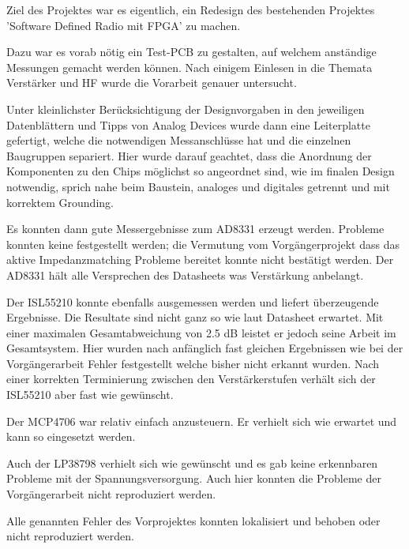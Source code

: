 Ziel des Projektes war es eigentlich, ein Redesign des bestehenden Projektes 'Software Defined Radio mit FPGA' zu machen.

Dazu war es vorab nötig ein Test-PCB zu gestalten, auf welchem anständige Messungen gemacht werden können.
Nach einigem Einlesen in die Themata Verstärker und HF wurde die Vorarbeit genauer untersucht.

Unter kleinlichster Berücksichtigung der Designvorgaben in den jeweiligen Datenblättern und Tipps von Analog Devices\cite{StayingWellGrounded2012} wurde dann eine Leiterplatte gefertigt, welche die notwendigen Messanschlüsse hat und die einzelnen Baugruppen separiert. Hier wurde darauf geachtet, dass die Anordnung der Komponenten zu den Chips möglichst so angeordnet sind, wie im finalen Design notwendig, sprich nahe beim Baustein, analoges und digitales getrennt und mit korrektem Grounding.

Es konnten dann gute Messergebnisse zum AD8331 erzeugt werden. Probleme konnten keine festgestellt werden; die Vermutung vom Vorgängerprojekt dass das aktive Impedanzmatching Probleme bereitet konnte nicht bestätigt werden. Der AD8331 hält alle Versprechen des Datasheets was Verstärkung anbelangt.

Der ISL55210 konnte ebenfalls ausgemessen werden und liefert überzeugende Ergebnisse. Die Resultate sind nicht ganz so wie laut Datasheet erwartet. Mit einer maximalen Gesamtabweichung von 2.5 dB leistet er jedoch seine Arbeit im Gesamtsystem. Hier wurden nach anfänglich fast gleichen Ergebnissen wie bei der Vorgängerarbeit Fehler festgestellt welche bisher nicht erkannt wurden. Nach einer korrekten Terminierung zwischen den Verstärkerstufen verhält sich der ISL55210 aber fast wie gewünscht.

Der MCP4706 war relativ einfach anzusteuern. Er verhielt sich wie erwartet und kann so eingesetzt werden.

Auch der LP38798 verhielt sich wie gewünscht und es gab keine erkennbaren Probleme mit der Spannungsversorgung. Auch hier konnten die Probleme der Vorgängerarbeit nicht reproduziert werden.

Alle genannten Fehler des Vorprojektes konnten lokalisiert und behoben oder nicht reproduziert werden.